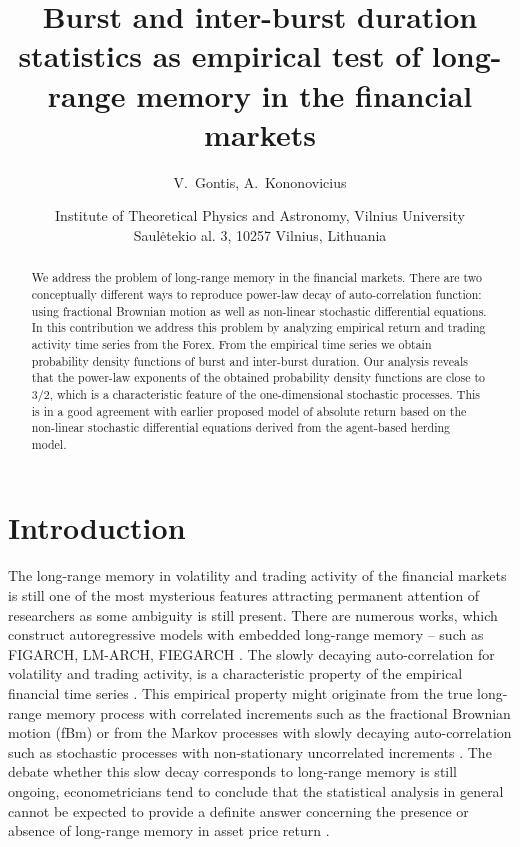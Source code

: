 \documentclass{article}
\title{Burst and inter-burst duration statistics as empirical test of long-range memory in the financial markets}
\author{V.~Gontis, A.~Kononovicius}
\date{\small Institute of Theoretical Physics and Astronomy, Vilnius University\\Saul{\. e}tekio al. 3, 10257 Vilnius, Lithuania}
\begin{document}
\maketitle

\begin{abstract}
We address the problem of long-range memory in the financial markets. There are two conceptually different ways to reproduce power-law decay of auto-correlation function: using fractional Brownian motion as well as non-linear stochastic differential equations. In this contribution we address this problem by analyzing empirical return and trading activity time series from the Forex. From the empirical time series we obtain probability density functions of burst and inter-burst duration. Our analysis reveals that the power-law exponents of the obtained probability density functions are close to $3/2$, which is a characteristic feature of the one-dimensional stochastic processes. This is in a good agreement with earlier proposed model of absolute return based on the non-linear  stochastic differential equations derived from the agent-based herding model.
\end{abstract}

\section{Introduction}
The long-range memory in volatility and trading activity of the financial markets is still one of the most mysterious features attracting permanent attention of researchers \cite{Engle2001QF,Plerou2001QF,Gabaix2003Nature,Ding2003Springer} as some ambiguity is still present.
There are numerous works, which construct autoregressive models with embedded long-range memory -- such as FIGARCH, LM-ARCH, FIEGARCH  \cite{Giraitis2007,Giraitis2009,Conrad2010,Arouri2012,Tayefi2012}. 
The slowly decaying auto-correlation for volatility and trading activity, is a characteristic property of the empirical financial time series \cite{Plerou2001QF,Gabaix2003Nature,Ding2003Springer}. This empirical property might originate from the true long-range memory process with correlated increments such as the fractional Brownian motion (fBm) \cite{Mandelbrot1968SIAMR,McCauley2006PhysA,McCauley2007PhysA} or from the Markov processes with slowly decaying auto-correlation such as stochastic processes with non-stationary uncorrelated increments \cite{Gontis2004PhysA,McCauley2006PhysA,McCauley2007PhysA,Ruseckas2011PRE}. The debate whether this slow decay corresponds to long-range memory is still ongoing, econometricians tend to conclude that the statistical analysis in general cannot be expected to provide a definite answer concerning the presence or absence of long-range memory in asset price return \cite{Lo1991Econometrica,Willinger1999FinStoch,Mikosch2003}. 
\end{document}
